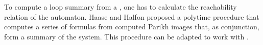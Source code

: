 
To compute a loop summary from a \qvasrs, one has to calculate the reachability relation of the automaton. Haase and Halfon \cite{DBLP:conf/rp/HaaseH14} proposed a polytime procedure that computes a series of formulas from computed Parikh images that, as conjunction, form a summary of the system. This procedure can be adapted to work with \qvasrs. \\ \par